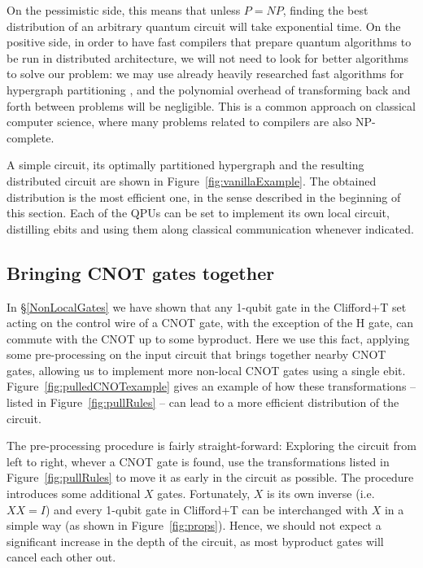 On the pessimistic side, this means that unless \(P=NP\), finding the best distribution of an arbitrary quantum circuit will take exponential time. On the positive side, in order to have fast compilers that prepare quantum algorithms to be run in distributed architecture, we will not need to look for better algorithms to solve our problem: we may use already heavily researched fast algorithms for hypergraph partitioning \citep{KaHyPart}, and the polynomial overhead of transforming back and forth between problems will be negligible. This is a common approach on classical computer science, where many problems related to compilers are also NP-complete.





A simple circuit, its optimally partitioned hypergraph and the resulting distributed circuit are shown in Figure~\ref{fig:vanillaExample}. The obtained distribution is the most efficient one, in the sense described in the beginning of this section. Each of the QPUs can be set to implement its own local circuit, distilling ebits and using them along classical communication whenever indicated.


\subsection{Bringing CNOT gates together}
\label{pullCNOTs}

In \S\ref{NonLocalGates} we have shown that any 1-qubit gate in the Clifford+T set acting on the control wire of a CNOT gate, with the exception of the H gate, can commute with the CNOT up to some byproduct. Here we use this fact, applying some pre-processing on the input circuit that brings together nearby CNOT gates, allowing us to implement more non-local CNOT gates using a single ebit. Figure~\ref{fig:pulledCNOTexample} gives an example of how these transformations -- listed in Figure~\ref{fig:pullRules} -- can lead to a more efficient distribution of the circuit.



The pre-processing procedure is fairly straight-forward: Exploring the circuit from left to right, whever a CNOT gate is found, use the transformations listed in Figure~\ref{fig:pullRules} to move it as early in the circuit as possible. The procedure introduces some additional \(X\) gates. Fortunately, \(X\) is its own inverse (i.e.\ \(XX = I\)) and every 1-qubit gate in Clifford+T can be interchanged with \(X\) in a simple way (as shown in Figure~\ref{fig:props}). Hence, we should not expect a significant increase in the depth of the circuit, as most byproduct gates will cancel each other out.

